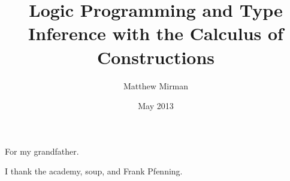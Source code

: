 \documentclass[12pt]{cmuthesis}
\begin{document}
 
\frontmatter

\pagestyle{empty}

\title{ 
{\bf Logic Programming and Type Inference with the Calculus of Constructions }}
\author{Matthew Mirman}
\date{May 2013}
\trnumber{}


\support{}
\disclaimer{}


\maketitle

\begin{dedication}
For my grandfather.
\end{dedication}

\pagestyle{plain} %


\begin{abstract}



\end{abstract}

\begin{acknowledgments}
I thank the academy, soup, and Frank Pfenning. %
\end{acknowledgments}

\tableofcontents
\listoffigures
\listoftables

\mainmatter

\renewcommand{\baselinestretch}{1.66}\normalsize

%
%
%
%
%
\end{document}
